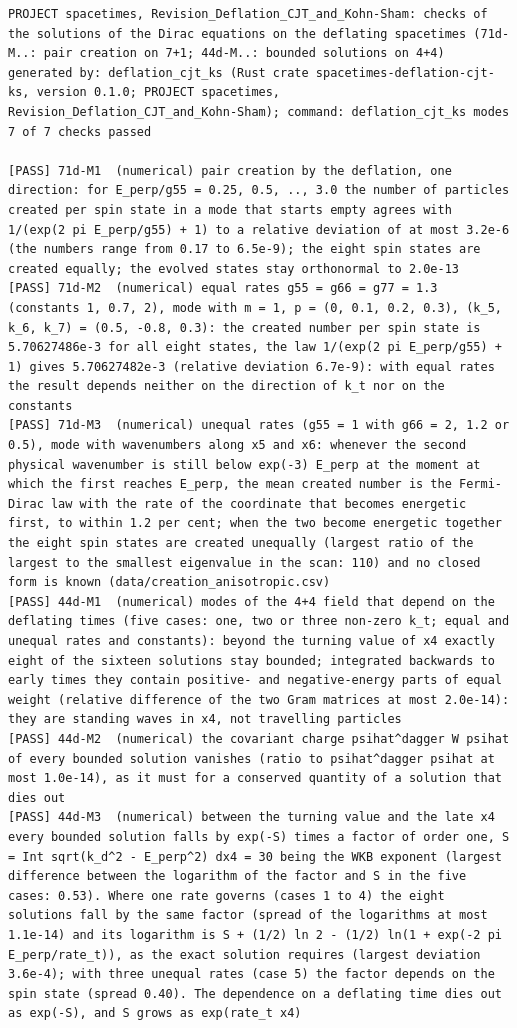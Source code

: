 \documentclass[
  10pt,
]{article}
\begin{document}
\begin{verbatim}
PROJECT spacetimes, Revision_Deflation_CJT_and_Kohn-Sham: checks of the solutions of the Dirac equations on the deflating spacetimes (71d-M..: pair creation on 7+1; 44d-M..: bounded solutions on 4+4)
generated by: deflation_cjt_ks (Rust crate spacetimes-deflation-cjt-ks, version 0.1.0; PROJECT spacetimes, Revision_Deflation_CJT_and_Kohn-Sham); command: deflation_cjt_ks modes
7 of 7 checks passed

[PASS] 71d-M1  (numerical) pair creation by the deflation, one direction: for E_perp/g55 = 0.25, 0.5, .., 3.0 the number of particles created per spin state in a mode that starts empty agrees with 1/(exp(2 pi E_perp/g55) + 1) to a relative deviation of at most 3.2e-6 (the numbers range from 0.17 to 6.5e-9); the eight spin states are created equally; the evolved states stay orthonormal to 2.0e-13
[PASS] 71d-M2  (numerical) equal rates g55 = g66 = g77 = 1.3 (constants 1, 0.7, 2), mode with m = 1, p = (0, 0.1, 0.2, 0.3), (k_5, k_6, k_7) = (0.5, -0.8, 0.3): the created number per spin state is 5.70627486e-3 for all eight states, the law 1/(exp(2 pi E_perp/g55) + 1) gives 5.70627482e-3 (relative deviation 6.7e-9): with equal rates the result depends neither on the direction of k_t nor on the constants
[PASS] 71d-M3  (numerical) unequal rates (g55 = 1 with g66 = 2, 1.2 or 0.5), mode with wavenumbers along x5 and x6: whenever the second physical wavenumber is still below exp(-3) E_perp at the moment at which the first reaches E_perp, the mean created number is the Fermi-Dirac law with the rate of the coordinate that becomes energetic first, to within 1.2 per cent; when the two become energetic together the eight spin states are created unequally (largest ratio of the largest to the smallest eigenvalue in the scan: 110) and no closed form is known (data/creation_anisotropic.csv)
[PASS] 44d-M1  (numerical) modes of the 4+4 field that depend on the deflating times (five cases: one, two or three non-zero k_t; equal and unequal rates and constants): beyond the turning value of x4 exactly eight of the sixteen solutions stay bounded; integrated backwards to early times they contain positive- and negative-energy parts of equal weight (relative difference of the two Gram matrices at most 2.0e-14): they are standing waves in x4, not travelling particles
[PASS] 44d-M2  (numerical) the covariant charge psihat^dagger W psihat of every bounded solution vanishes (ratio to psihat^dagger psihat at most 1.0e-14), as it must for a conserved quantity of a solution that dies out
[PASS] 44d-M3  (numerical) between the turning value and the late x4 every bounded solution falls by exp(-S) times a factor of order one, S = Int sqrt(k_d^2 - E_perp^2) dx4 = 30 being the WKB exponent (largest difference between the logarithm of the factor and S in the five cases: 0.53). Where one rate governs (cases 1 to 4) the eight solutions fall by the same factor (spread of the logarithms at most 1.1e-14) and its logarithm is S + (1/2) ln 2 - (1/2) ln(1 + exp(-2 pi E_perp/rate_t)), as the exact solution requires (largest deviation 3.6e-4); with three unequal rates (case 5) the factor depends on the spin state (spread 0.40). The dependence on a deflating time dies out as exp(-S), and S grows as exp(rate_t x4)

\end{verbatim}
\end{document}
